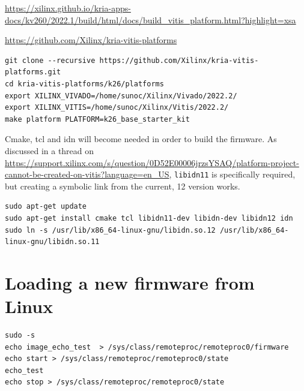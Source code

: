 \documentclass[10pt]{article}
\begin{document}
\url{https://xilinx.github.io/kria-apps-docs/kv260/2022.1/build/html/docs/build_vitis_platform.html?highlight=xsa}

\url{https://github.com/Xilinx/kria-vitis-platforms}

\begin{tcolorbox}
\begin{verbatim}
git clone --recursive https://github.com/Xilinx/kria-vitis-platforms.git
cd kria-vitis-platforms/k26/platforms
export XILINX_VIVADO=/home/sunoc/Xilinx/Vivado/2022.2/
export XILINX_VITIS=/home/sunoc/Xilinx/Vitis/2022.2/
make platform PLATFORM=k26_base_starter_kit
\end{verbatim}
\end{tcolorbox}

Cmake, tcl and idn will become needed in order to build the firmware.
As discussed in a thread on \href{Xilinx community forum}{https://support.xilinx.com/s/question/0D52E00006jrzsYSAQ/platform-project-cannot-be-created-on-vitis?language=en\_US}, \verb|libidn11| is specifically required, but
creating a symbolic link from the current, 12 version works.
\begin{tcolorbox}
\begin{verbatim}
sudo apt-get update
sudo apt-get install cmake tcl libidn11-dev libidn-dev libidn12 idn
sudo ln -s /usr/lib/x86_64-linux-gnu/libidn.so.12 /usr/lib/x86_64-linux-gnu/libidn.so.11
\end{verbatim}
\end{tcolorbox}


\section{Loading a new firmware from Linux}
\label{sec:loading-new-firmware}


\begin{tcolorbox}
\begin{verbatim}
sudo -s
echo image_echo_test  > /sys/class/remoteproc/remoteproc0/firmware
echo start > /sys/class/remoteproc/remoteproc0/state
echo_test
echo stop > /sys/class/remoteproc/remoteproc0/state
\end{verbatim}
\end{tcolorbox}
\end{document}
